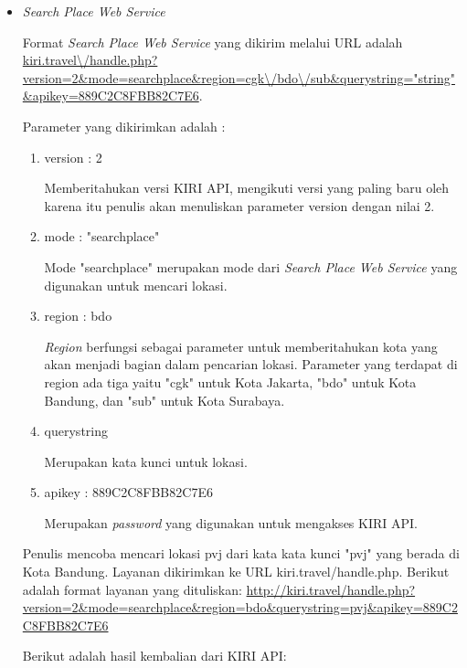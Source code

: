 \begin{itemize}
	\item \textit{Search Place Web Service}
	
	Format \textit{Search Place Web Service} yang dikirim melalui URL adalah \url{kiri.travel\/handle.php?version=2\&mode=searchplace\&region=cgk\/bdo\/sub\&querystring="string"\&apikey=889C2C8FBB82C7E6}.
	
	Parameter yang dikirimkan adalah :
	
	\begin{enumerate}
		\item version : 2
		
		Memberitahukan versi KIRI API, mengikuti versi yang paling baru oleh karena itu penulis akan menuliskan parameter version dengan nilai 2.
		\item mode : "searchplace"
		
		Mode "searchplace" merupakan mode dari \textit{Search Place Web Service} yang digunakan untuk mencari lokasi.
		\item region : bdo
		
		\textit{Region} berfungsi sebagai parameter untuk memberitahukan kota yang akan menjadi bagian dalam pencarian lokasi. Parameter yang terdapat di region ada tiga yaitu "cgk" untuk Kota Jakarta, "bdo" untuk Kota Bandung, dan "sub" untuk Kota Surabaya.
		\item querystring
		
		Merupakan kata kunci untuk lokasi.
		\item apikey : 889C2C8FBB82C7E6
		
		Merupakan \textit{password} yang digunakan untuk mengakses KIRI API.
	\end{enumerate}
	
	Penulis mencoba mencari lokasi pvj dari kata kata kunci "pvj" yang berada di Kota Bandung. Layanan dikirimkan ke URL kiri.travel/handle.php. Berikut adalah format layanan yang dituliskan: \url{http://kiri.travel/handle.php?version=2\&mode=searchplace\&region=bdo\&querystring=pvj\&apikey=889C2C8FBB82C7E6}
	
	Berikut adalah hasil kembalian dari KIRI API:
	

\end{itemize}
